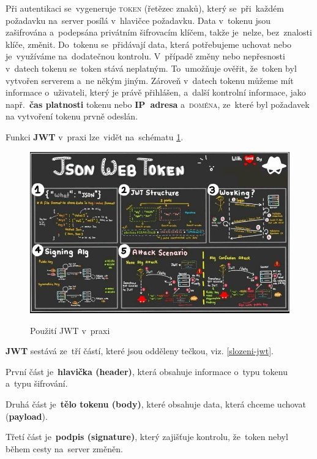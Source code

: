 \documentclass[14pt,a4paper]{article}
\begin{document}
            Při autentikaci se~vygeneruje \textsc{token} (řetězec znaků), který se~při~každém požadavku na~server posílá v~hlavičce požadavku. Data v~tokenu jsou zašifrována a~podepsána privátním šifrovacím klíčem, takže je~nelze, bez~znalosti klíče, změnit. Do~tokenu se~přidávají data, která potřebujeme uchovat nebo je~využíváme na~dodatečnou kontrolu. V~případě změny nebo nepřesnosti v~datech tokenu se~token stává neplatným. To~umožňuje ověřit, že~token byl vytvořen serverem a~ne někým jiným. Zároveň v~datech tokenu můžeme mít informace o~uživateli, který je právě přihlášen, a~další kontrolní informace, jako např.~\textbf{čas platnosti} tokenu nebo \textbf{IP~adresa} a~\textsc{doména}, ze~které byl požadavek na vytvoření tokenu prvně odeslán.

            Funkci \textbf{JWT} v~praxi lze~vidět na~schématu \ref{model-jwt}.

            \begin{figure}
                \centering
                \includegraphics[width=.9\linewidth]{img/jwt.jpg}
                \label{model-jwt}
                \caption{Použití JWT v~praxi}
            \end{figure}

            \textbf{JWT} sestává ze~tří částí, které jsou odděleny tečkou, viz. \ref{slozeni-jwt}.
            
            První část je~\textbf{hlavička (header)}, která obsahuje informace o~typu tokenu a~typu šifrování.
            
            Druhá část je~\textbf{tělo tokenu (body)}, které obsahuje data, která chceme uchovat (\textbf{payload}).
            
            Třetí část je~\textbf{podpis (signature)}, který zajišťuje kontrolu, že~token nebyl během cesty na~server změněn.
\end{document}
